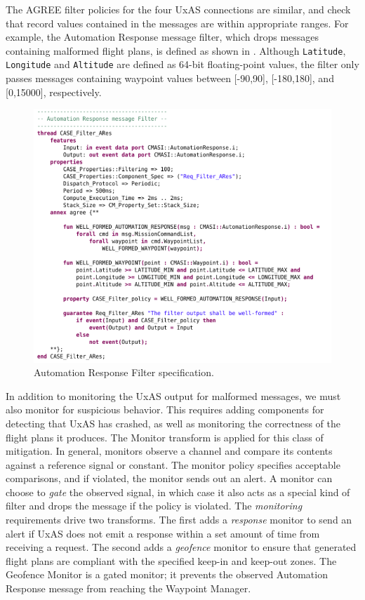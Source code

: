 The AGREE filter policies for the four UxAS connections are similar, and check that record values contained in the messages are within appropriate ranges.  For example, the Automation Response message filter, which drops messages containing malformed flight plans, is defined as shown in .  Although \texttt{Latitude}, \texttt{Longitude} and \texttt{Altitude} are defined as 64-bit floating-point values, the filter only passes messages containing waypoint values between [-90,90], [-180,180], and [0,15000], respectively. 

\begin{figure}[h]
	\centering
	\includegraphics[width=1\columnwidth]{figs/automation-response-filter.png}
	\caption{Automation Response Filter specification.} 
	\label{fig:automation-response-filter} 
\end{figure}

In addition to monitoring the UxAS output for malformed messages, we must also monitor for suspicious behavior.  This requires adding components for detecting that UxAS has crashed, as well as monitoring the correctness of the flight plans it produces.  The Monitor transform is applied for this class of mitigation.  In general, monitors observe a channel and compare its contents against a reference signal or constant.  The monitor policy specifies acceptable comparisons, and if violated, the monitor sends out an alert.  A monitor can choose to \textit{gate} the observed signal, in which case it also acts as a special kind of filter and drops the message if the policy is violated.  The \textit{monitoring} requirements drive two transforms.  The first adds a \textit{response} monitor to send an alert if UxAS does not emit a response within a set amount of time from receiving a request.  The second adds a \textit{geofence} monitor to ensure that generated flight plans are compliant with the specified keep-in and keep-out zones.  The Geofence Monitor is a gated monitor; it prevents the observed Automation Response message from reaching the Waypoint Manager. 

